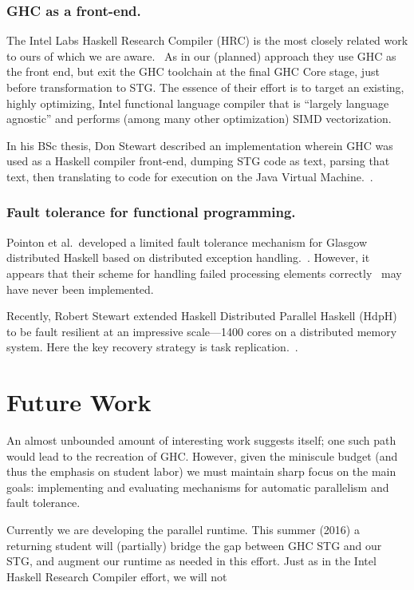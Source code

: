 \documentclass{llncs}
\begin{document}
\subsubsection{GHC as a front-end.}
The Intel Labs Haskell Research Compiler (HRC) is the most closely related
work to ours of which we are aware.~\cite{Liu:2013,Petersen:2013} As in our
(planned) approach they use GHC as the front end, but exit the GHC toolchain
at the final GHC Core stage, just before transformation to STG.  The essence
of their effort is to target an existing, highly optimizing, Intel functional
language compiler that is ``largely language agnostic'' and performs (among
many other optimization) SIMD vectorization.

In his BSc thesis, Don Stewart described an implementation wherein GHC was
used as a Haskell compiler front-end, dumping STG code as text, parsing that
text, then translating to code for execution on the Java Virtual
Machine.~\cite{Stewart-BSc}.

\subsubsection{Fault tolerance for functional programming.}
Pointon et al.\ developed a limited fault tolerance mechanism for Glasgow
distributed Haskell based on distributed exception
handling.~\cite{Pointon:2001}.  However, it appears that their scheme for
handling failed processing elements correctly~\cite{} may have never been
implemented.

Recently, Robert Stewart extended Haskell Distributed Parallel Haskell
(HdpH)~\cite{hdph} to be fault resilient at an impressive scale---1400 cores
on a distributed memory system.  Here the key recovery strategy is task
replication.~\cite{Stewart:2013}.

\section{Future Work}

An almost unbounded amount of interesting work suggests itself; one such path
would lead to the recreation of GHC.  However, given the miniscule budget (and
thus the emphasis on student labor) we must maintain sharp focus on the main
goals:  implementing and evaluating mechanisms for automatic parallelism and
fault tolerance.

Currently we are developing the parallel runtime.  This summer (2016) a
returning student will (partially) bridge the gap between GHC STG and our STG,
and augment our runtime as needed in this effort.  Just as in the Intel Haskell
Research Compiler effort, we will not 
\end{document}
